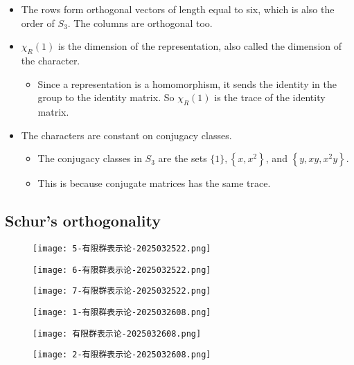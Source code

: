 \begin{itemize}
	\item The rows form orthogonal vectors of length equal to six, which is also the order of $S_3$. The columns are orthogonal too.
	\item $\chi_R(1)$ is the dimension of the representation, also called the dimension of the character.
	\begin{itemize}
		\item Since a representation is a homomorphism, it sends the identity in the group to the identity matrix. So $\chi_R(1)$ is the trace of the identity matrix.
	\end{itemize}
	\item The characters are constant on conjugacy classes.
	\begin{itemize}
		\item The conjugacy classes in $S_3$ are the sets $\{1\},\left\{x, x^2\right\}$, and $\left\{y, x y, x^2 y\right\}$.
		\item This is because conjugate matrices has the same trace.
	\end{itemize}
\end{itemize}

\subsection{Schur's orthogonality}

\begin{figure}[H]
\centering
\texttt{[image: 5-有限群表示论-2025032522.png]}
\label{}
\end{figure}
\begin{figure}[H]
\centering
\texttt{[image: 6-有限群表示论-2025032522.png]}
\label{}
\end{figure}
\begin{figure}[H]
\centering
\texttt{[image: 7-有限群表示论-2025032522.png]}
\label{}
\end{figure}
\begin{figure}[H]
\centering
\texttt{[image: 1-有限群表示论-2025032608.png]}
\label{}
\end{figure}
\begin{figure}[H]
\centering
\texttt{[image: 有限群表示论-2025032608.png]}
\label{}
\end{figure}
\begin{figure}[H]
\centering
\texttt{[image: 2-有限群表示论-2025032608.png]}
\label{}
\end{figure}
